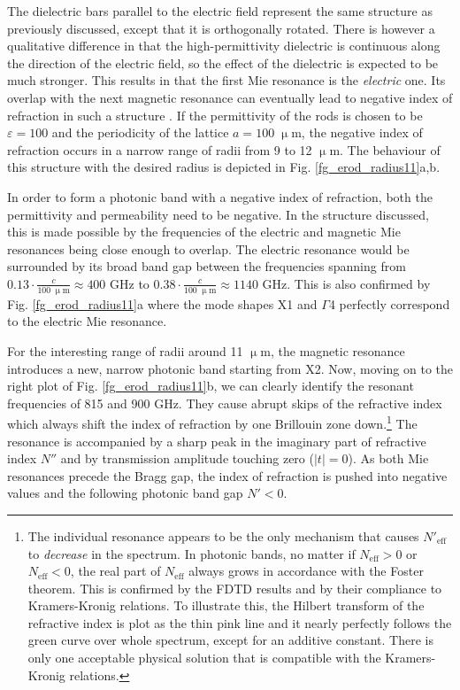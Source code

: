 \documentclass[letterpaper,12pt]{report}
\begin{document}
The dielectric bars parallel to the electric field represent the same structure as previously discussed, except that it is orthogonally rotated. There is however a qualitative difference in that the high-permittivity dielectric is continuous along the direction of the electric field, so the effect of the dielectric is expected to be much stronger. This results in that the first Mie resonance is the \textit{electric} one. Its overlap with the next magnetic resonance can eventually lead to negative index of refraction in such a structure \cite{peng2007, vynck2009}. If the permittivity of the rods is chosen to be $\varepsilon = 100$ and the periodicity of the lattice $a = 100\;\upmu$m, the negative index of refraction occurs in a narrow range of radii from 9 to 12 $\upmu$m. The behaviour of this structure with the desired radius is depicted in Fig. \ref{fg_erod_radius11}a,b.

In order to form a photonic band with a negative index of refraction, both the permittivity and permeability need to be negative. In the structure discussed, this is made possible by the frequencies of the electric and magnetic Mie resonances being close enough to overlap.
The electric resonance would be surrounded by its broad band gap between the frequencies spanning from $0.13 \cdot\frac{c}{100\;\upmu\text{m}} \approx 400$ GHz to  $0.38 \cdot\frac{c}{100\;\upmu\text{m}} \approx 1140$ GHz. This is also confirmed by Fig. \ref{fg_erod_radius11}a where the mode shapes X1 and $\Gamma$4 perfectly correspond to the electric Mie resonance. 

For the interesting range of radii around 11 $\upmu$m, the magnetic resonance introduces a new, narrow photonic band starting from X2. Now, moving on to the right plot of Fig. \ref{fg_erod_radius11}b, we can clearly identify the resonant frequencies of 815 and 900 GHz. They cause abrupt skips of the refractive index which always shift the index of refraction by one Brillouin zone down.\footnote{The individual resonance appears to be the only mechanism that causes $N'_{\text{eff}}$ to \textit{decrease} in the spectrum. In photonic bands, no matter if $N_{\text{eff}} > 0$  or $N_{\text{eff}} < 0$, the real part of $N_{\text{eff}}$ always grows in accordance with the Foster theorem. This is confirmed by the FDTD results and by their compliance to Kramers-Kronig relations. To illustrate this, the Hilbert transform of the refractive index is plot as the thin pink line and it nearly perfectly follows the green curve over whole spectrum, except for an additive constant. There is  only one acceptable physical solution that is compatible with the Kramers-Kronig relations.}
The resonance is accompanied by a sharp peak in the imaginary part of refractive index $N''$ and by transmission amplitude touching zero ($|t| = 0$). As both Mie resonances precede the Bragg gap, the index of refraction is pushed into negative values and the following photonic band gap $N' < 0$.
\end{document}
